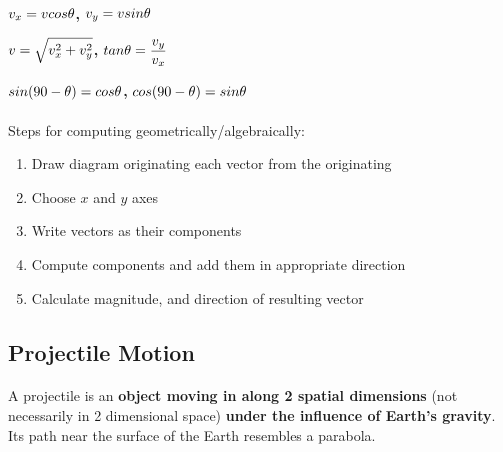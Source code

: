 \documentclass[12pt, a4paper]{article}
\begin{document}
\paragraph*{}

{
    \centering
    $\mathlarger{v_x=vcos\theta}$\textbf{,} $\mathlarger{v_y=vsin\theta}$

    $\mathlarger{v = \sqrt{v_x^2 + v_y^2}}$\textbf{,} $\mathlarger{tan\theta=\frac{v_y}{v_x}}$

    $\mathlarger{sin(90-\theta) = cos\theta}$\textbf{,} $\mathlarger{cos(90-\theta) = sin\theta}$

}

\paragraph*{}
Steps for computing geometrically/algebraically:
\begin{enumerate}
    \item Draw diagram originating each vector from the originating
    \item Choose $x$ and $y$ axes
    \item Write vectors as their components
    \item Compute components and add them in appropriate direction
    \item Calculate magnitude, and direction of resulting vector
\end{enumerate}


\newpage
\subsection{Projectile Motion}

\paragraph*{}
A projectile is an \textbf{object moving in along 2 spatial dimensions} (not necessarily in 2 dimensional space)
\textbf{under the influence of Earth's gravity}. Its path near the surface of the Earth resembles 
a parabola.
\end{document}

